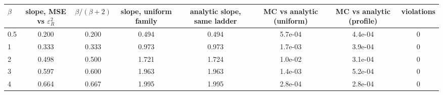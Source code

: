 \begin{tabular}{lccccccc}
\toprule
$\beta$ & slope, MSE vs $\varepsilon_R^2$ & $\beta/(\beta+2)$ & slope, uniform family & analytic slope, same ladder & MC vs analytic (uniform) & MC vs analytic (profile) & violations \\
\midrule
0.5 & 0.200 & 0.200 & 0.494 & 0.494 & 5.7e-04 & 4.4e-04 & 0 \\
1 & 0.333 & 0.333 & 0.973 & 0.973 & 1.7e-03 & 3.9e-04 & 0 \\
2 & 0.498 & 0.500 & 1.721 & 1.724 & 1.0e-02 & 3.1e-04 & 0 \\
3 & 0.597 & 0.600 & 1.963 & 1.963 & 1.4e-03 & 5.2e-04 & 0 \\
4 & 0.664 & 0.667 & 1.995 & 1.995 & 2.8e-04 & 2.8e-04 & 0 \\
\bottomrule
\end{tabular}
